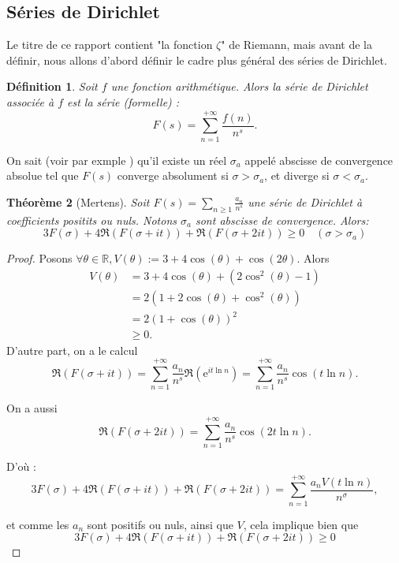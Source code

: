 \documentclass[french]{report}
\newtheorem{theorem}{Théorème}[section]
\newtheorem{definition}[theorem]{Définition}
\begin{document}
\subsection{Séries de Dirichlet}

Le titre de ce rapport contient "la fonction $\zeta$" de Riemann, mais avant de la définir, nous allons d'abord définir le cadre plus général des séries de Dirichlet.

\begin{definition}\label{def:serie-dirichlet}
  Soit $f$ une fonction arithmétique. Alors la série de Dirichlet associée à $f$ est la série (formelle) :
  \[ F(s) = \sum_{n=1}^{+\infty}\frac{f(n)}{n^s}. \]
\end{definition}

On sait (voir par exmple \cite{hindry}) qu'il existe un réel $\sigma_a$ appelé abscisse de convergence absolue tel que $F(s)$ converge absolument si $\sigma>\sigma_a$, et diverge si $\sigma<\sigma_a$.

\begin{theorem}[Mertens]\label{thm:mertens-positif}
  Soit $F(s) =\sum_{n\geq1}\frac{a_n}{n^s}$ une série de Dirichlet à coefficients positits ou nuls. Notons $\sigma_a$ sont abscisse de convergence. Alors:
  \[ 3F(\sigma)+4\Re(F(\sigma+it))+\Re(F(\sigma+2it))\geq0 \quad(\sigma>\sigma_a) \]
\end{theorem}

\begin{proof}
  Posons $\forall\theta\in\mathbb{R}, V(\theta) := 3+4\cos(\theta)+\cos(2\theta)$. Alors
  \begin{align*}
    V(\theta) &= 3+4\cos(\theta)+(2\cos^2(\theta)-1) \\
              &= 2(1+2\cos(\theta)+\cos^2(\theta)) \\
              &= 2(1+\cos(\theta))^2 \\
              &\geq0.
  \end{align*}
  D'autre part, on a le calcul
  \[
    \Re(F(\sigma+it))
    =\sum_{n=1}^{+\infty}\frac{a_n}{n^s}\Re(\mathrm{e}^{it\ln n})
    =\sum_{n=1}^{+\infty}\frac{a_n}{n^s}\cos(t\ln n).
  \]

  On a aussi
  \[
    \Re(F(\sigma+2it))
    = \sum_{n=1}^{+\infty}\frac{a_n}{n^s}\cos(2t\ln n).
  \]

  D'où :
  \[
    3F(\sigma)+4\Re(F(\sigma+it))+\Re(F(\sigma+2it))
    = \sum_{n=1}^{+\infty}\frac{a_n V(t\ln n)}{n^\sigma},
  \]

  et comme les $a_n$ sont positifs ou nuls, ainsi que $V$, cela implique bien que
  \[ 3F(\sigma)+4\Re(F(\sigma+it))+\Re(F(\sigma+2it))\geq0 \]
  
\end{proof}
\end{document}
